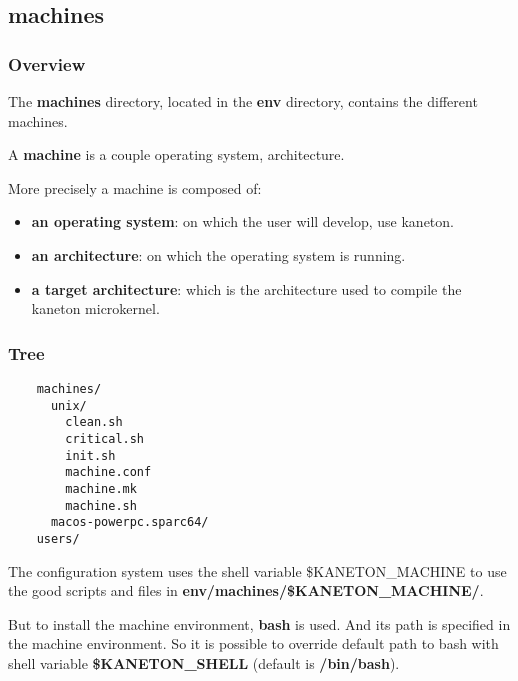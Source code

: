 {%
%

\subsection{machines}


\begin{frame}
  \frametitle{Overview}

  The \textbf{machines} directory, located in the \textbf{env} directory,
  contains the different machines.

  \nl

  A \textbf{machine} is a couple operating system, architecture.

  \nl

  More precisely a machine is composed of:

  \begin{itemize}[<+->]
    \item
      \textbf{an operating system}: on which the user will develop,
      use kaneton.
    \item
      \textbf{an architecture}: on which the operating system
      is running.
    \item
      \textbf{a target architecture}: which is the architecture used
      to compile the kaneton microkernel.
  \end{itemize}
\end{frame}


\begin{frame}[containsverbatim]
  \frametitle{Tree}

  \begin{verbatim}
    machines/
      unix/
        clean.sh
        critical.sh
        init.sh
        machine.conf
        machine.mk
        machine.sh
      macos-powerpc.sparc64/
    users/
  \end{verbatim}

  The configuration system uses the shell variable \$KANETON\_MACHINE to
  use the good scripts and files in \textbf{env/machines/\$KANETON\_MACHINE/}.

  \nl

  But to install the machine environment, \textbf{bash} is used. And its
  path is specified in the machine environment. So it is possible to override
  default path to bash with shell variable \textbf{\$KANETON\_SHELL} (default
  is \textbf{/bin/bash}).
\end{frame}

}

